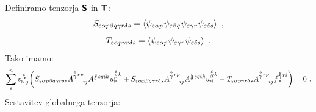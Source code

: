 Definiramo tenzorja $\bm{\mathsf{S}}$ in $\bm{\mathsf{T}}$:
\begin{equation}
   S_{\varepsilon   \alpha p   \beta q   \gamma r   \delta s}
   =
   \expval{
      \psi_{ \varepsilon   \alpha p} \mkern1mu
      \psi_{ \varepsilon   \beta q} \mkern1mu
      \psi_{ \varepsilon   \gamma r} \mkern1mu
      \psi_{ \varepsilon   \delta s} } \ ,
\end{equation}
\begin{equation}
   T_{\varepsilon   \alpha p   \gamma r   \delta s}
   =
   \expval{
      \psi_{\varepsilon \alpha p} \mkern1mu
      \psi_{\varepsilon \gamma r} \mkern1mu
      \psi_{ \varepsilon \delta s} } \ .
\end{equation}
Tako imamo:
\begin{equation}
   \sum^n_\varepsilon v^{\mkern 2mu \substack{\varepsilon \\[-0.59mm] \alpha \\[-0.2mm]}}_{\triangleright \mkern5mu j}
   \qty( S_{\varepsilon   \alpha p   \beta q   \gamma r   \delta s}
   A^{\substack{\mkern2mu \varepsilon \\[0.12mm] \gamma} \mkern2mu r p}_{\mkern29mu i j}
   A^{\substack{\mkern2mu \varepsilon \\[-0.59mm] \delta} \mkern2mu s q i k} \mkern1mu
   u^{\substack{\mkern2mu \varepsilon \\[0.14mm] \beta} \mkern2mu k}_\triangleright
   +
   S_{\varepsilon   \alpha p   \beta q   \gamma r   \delta s}
   A^{\substack{\mkern2mu \varepsilon \\[0.12mm] \gamma} \mkern2mu r p}_{\mkern29mu i j}
   A^{\substack{\mkern2mu \varepsilon \\[-0.59mm] \delta} \mkern2mu s q i k}
   u^{\substack{\mkern2mu \varepsilon \\[0.14mm] \beta} \mkern2mu k}_\triangleleft
   -
   T_{\varepsilon   \alpha p   \gamma r   \delta s}
   A^{\substack{\mkern2mu \varepsilon \\[0.12mm] \gamma} \mkern2mu r p}_{\mkern29mu i j}
   f^{\substack{\mkern2mu \varepsilon \\[-0.59mm] \gamma} \mkern2mu r i}_{\bowtie}
   ) = 0 \ .
\end{equation}
Sestavitev globalnega tenzorja:
